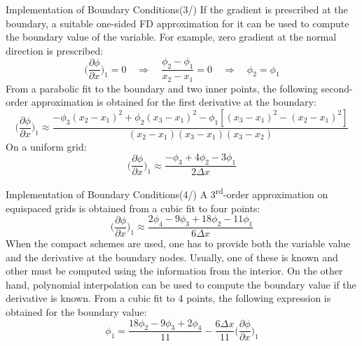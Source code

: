 \documentclass[10pt]{beamer}
\begin{document}
\begin{frame}{Implementation of Boundary Conditions(3/)}
If the gradient is prescribed at the boundary, a suitable one-sided FD approximation for it can be used to compute the boundary value of the variable.\newline \newline
For example, zero gradient at the normal direction is prescribed:
    \[
    \bigg( \frac{\partial \phi}{\partial x}\bigg)_{1} = 0 \quad \Rightarrow \quad \frac{\phi_{2}-\phi_{1}}{x_{2}-x_{1}} = 0 \quad \Rightarrow \quad \phi_{2} = \phi_{1}  
    \]
From a parabolic fit to the boundary and two inner points, the following second-order approximation is obtained for the first derivative at the boundary:
    \[
    \bigg( \frac{\partial \phi}{\partial x}\bigg)_{1} \approx \frac{-\phi_{3}(x_{2}-x_{1})^2 + \phi_{2}(x_{3}-x_{1})^{2} - \phi_{1}[(x_{3}-x_{1})^{2}-(x_{2}-x_{1})^{2}]}{(x_{2}-x_{1})(x_{3}-x_{1})(x_{3}-x_{2})}
    \]
On a uniform grid:
    \[
    \bigg( \frac{\partial \phi}{\partial x}\bigg)_{1} \approx \frac{-\phi_{3}+4\phi_{2}-3\phi_{1}}{2\Delta x}
    \]
\end{frame}
\begin{frame}{Implementation of Boundary Conditions(4/)}
A 3\textsuperscript{rd}-order approximation on equispaced grids is obtained from a cubic fit to four points:
    \[
     \bigg( \frac{\partial \phi}{\partial x}\bigg)_{1} \approx 
     \frac{2\phi_{4}-9\phi_{3}+18\phi_{2}-11\phi_{1}}{6\Delta x}
    \]
When the compact schemes are used, one has to provide both the variable value and the derivative at the boundary nodes. Usually, one of these is known and other must be computed using the information from the interior. On the other hand, polynomial interpolation can be used to compute the boundary value if the derivative is known. From a cubic fit to 4 points, the following expression is obtained for the boundary value:
    \[\phi_{1} = \frac{18\phi_{2}-9\phi_{3}+2\phi_{4}}{11} - \frac{6\Delta x}{11}\bigg( \frac{\partial \phi}{\partial x}\bigg)_{1}\]
\end{frame}
\end{document}
